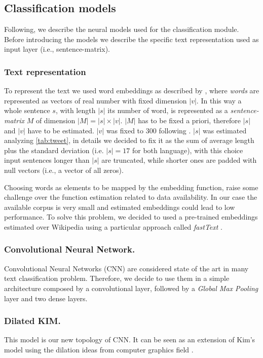 \subsection{Classification models} \label{subsec:classificationModel}
Following, we describe the neural models used for the classification module. Before introducing the models we describe the specific text representation used as input layer  (i.e., sentence-matrix).

\subsubsection{Text representation} \label{subsubsec:representation}
To represent the text we used word embeddings as described by \cite{bojanowski2016enriching}, where \emph{words} are represented as vectors of real number with fixed dimension $|v|$.
In this way a whole sentence $s$, with length $|s|$ its number of word, is represented as a \emph{sentence-matrix} $M$ of dimension $|M| = |s| \times |v|$. $|M|$ has to be fixed a priori, therefore $|s|$ and $|v|$ have to be estimated. $|v|$ was fixed to 300 following \cite{bojanowski2016enriching}. $|s|$ was estimated analyzing \cref{tab:tweet}, in details we decided to fix it as the sum of average length plus the standard deviation (i.e. $|s| = 17$ for both language), with this choice input sentences longer than $|s|$ are truncated, while shorter ones are padded with null vectors (i.e., a vector of all zeros).

Choosing words as elements to be mapped by the embedding function, raise some challenge over the function estimation related to data availability. In our case the available corpus is very small and estimated embeddings could lead to low performance.
To solve this problem, we decided to used a pre-trained embeddings estimated over Wikipedia using a particular approach called \emph{fastText} \cite{bojanowski2016enriching}.


\subsubsection{Convolutional Neural Network.}
Convolutional Neural Networks (CNN) are considered state of the art in many text classification problem. Therefore, we decide to use them in a simple architecture composed by a convolutional layer, followed by a \emph{Global Max Pooling} layer and two dense layers.

\subsubsection{Dilated KIM.}
This model is our new topology of CNN. It can be seen as an extension of Kim's model \cite{kim2014convolutional} using the dilation ideas from computer graphics field \cite{yu2015multi}.

